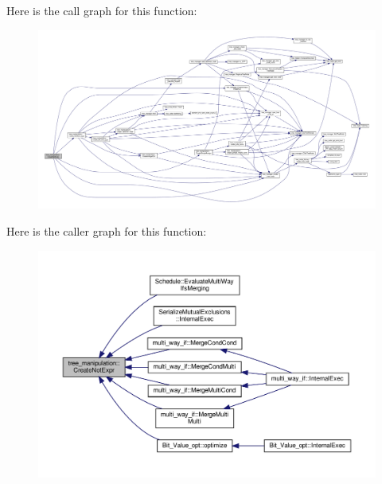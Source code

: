 Here is the call graph for this function\+:
\nopagebreak
\begin{figure}[H]
\begin{center}
\leavevmode
\includegraphics[width=350pt]{d0/d99/classtree__manipulation_a6bdfc591cd81c654827164247d9e7b08_cgraph}
\end{center}
\end{figure}
Here is the caller graph for this function\+:
\nopagebreak
\begin{figure}[H]
\begin{center}
\leavevmode
\includegraphics[width=350pt]{d0/d99/classtree__manipulation_a6bdfc591cd81c654827164247d9e7b08_icgraph}
\end{center}
\end{figure}
\mbox{\label{classtree__manipulation_a5ee94fdaf0baf5152b9e2161c9d6ce05}} 
